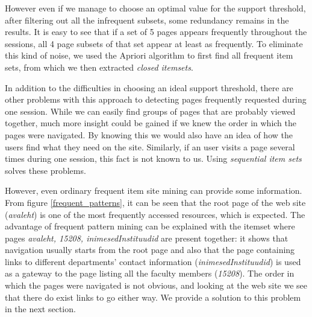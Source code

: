 \documentclass[12pt, english,a4paper]{article}
\begin{document}
However even if we manage to choose an optimal value for the support threshold, after filtering out all the infrequent subsets, some redundancy remains in the results. It is easy to see that if a set of 5 pages appears frequently throughout the sessions, all 4 page subsets of that set appear at least as frequently. To eliminate this kind of noise, we used the Apriori algorithm \cite{apriori} to first find all frequent item sets, from which we then extracted \emph{closed itemsets}.

In addition to the difficulties in choosing an ideal support threshold, there are other problems with this approach to detecting pages frequently requested during one session. While we can easily find groups of pages that are probably viewed together, much more insight could be gained if we knew the order in which the pages were navigated. By knowing this we would also have an idea of how the users find what they need on the site. Similarly, if an user visits a page several times during one session, this fact is not known to us. Using \emph{sequential item sets} solves these problems.

However, even ordinary frequent item site mining can provide some information. From figure \ref{frequent_patterns}, it can be seen that the root page of the web site (\emph{avaleht}) is one of the most frequently accessed resources, which is expected. The advantage of frequent pattern mining can be explained with the itemset where pages \emph{avaleht, 15208, inimesedInstituudid} are present together: it shows that navigation usually starts from the root page and also that the page containing links to different departments' contact information (\emph{inimesedInstituudid}) is used as a gateway to the page listing all the faculty members (\emph{15208}). The order in which the pages were navigated is not obvious, and looking at the web site we see that there do exist links to go either way. We provide a solution to this problem in the next section.
\end{document}
